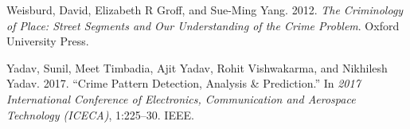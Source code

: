 \documentclass[conference,final,]{IEEEtran}
\newlength{\cslhangindent}
\newenvironment{CSLReferences}[2] %
 {\begin{list}{}{%
  \setlength{\itemindent}{0pt}
  \setlength{\leftmargin}{0pt}
  \setlength{\parsep}{0pt}
  \ifodd #1
   \setlength{\leftmargin}{\cslhangindent}
   \setlength{\itemindent}{-1\cslhangindent}
  \fi
  \setlength{\itemsep}{#2\baselineskip}}}
 {\end{list}}
\begin{document}
\begin{CSLReferences}{1}{0}
Weisburd, David, Elizabeth R Groff, and Sue-Ming Yang. 2012. \emph{The
Criminology of Place: Street Segments and Our Understanding of the Crime
Problem}. Oxford University Press.

Yadav, Sunil, Meet Timbadia, Ajit Yadav, Rohit Vishwakarma, and
Nikhilesh Yadav. 2017. {``Crime Pattern Detection, Analysis \&
Prediction.''} In \emph{2017 International Conference of Electronics,
Communication and Aerospace Technology (ICECA)}, 1:225--30. IEEE.

\end{CSLReferences}
\end{document}
